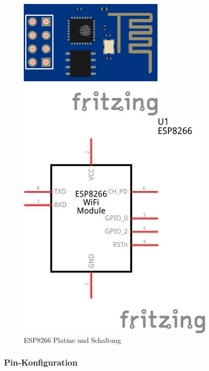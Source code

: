 \begin{figure}
	\centering
	\begin{minipage}{0.45\textwidth}
			\includegraphics[scale=1.5]{Abbildungen/ESP8266A}
	\end{minipage}
	\hfill
	\begin{minipage}{0.45\textwidth} 
			\includegraphics[scale=1.5]{Abbildungen/ESP8266}
	\end{minipage}
	\caption{ESP8266 Platine und Schaltung}
\end{figure}

\subsubsection{Pin-Konfiguration}
